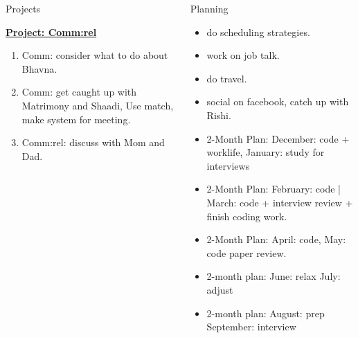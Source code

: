 \documentclass[serif, mathserif, final]{beamer}
\newcommand{\comments}[1]{}
\begin{document}
\begin{frame}
\begin{columns}
\begin{column}{0.5\textwidth}
\begin{block}{Projects}


{\underline{\textbf{Project: Comm:rel}}}
\begin{enumerate} 
  \tiny \item \tiny Comm: consider what to do about Bhavna.
\item \tiny Comm: get caught up with Matrimony and Shaadi, Use match, make system
  for meeting. 
\item \tiny Comm:rel: discuss with Mom and Dad. 
\end{enumerate} 
\end{block} 
\end{column} 


\begin{column}{0.5\textwidth}
\begin{block}{Planning} 
\comments{
{\underline{\textit{2-month plans}}}
{\underline{\textit{January and February:}}}
{\underline{\textit{March and April:}} }
{\underline{\textit{May and June:}}}
}

\begin{itemize}
\tiny \item \tiny do scheduling strategies. 
\item \tiny work on job talk. 
\item \tiny do travel. 
\item \tiny social on facebook, catch up with Rishi. 
\end{itemize} 
\begin{itemize} 
\tiny \item \tiny 2-Month Plan: December: code + worklife, January: study for interviews
\item \tiny 2-Month Plan: February: code | March:  code + interview review + finish coding work. 
\item \tiny 2-Month Plan: April: code, May: code paper review.
\item \tiny 2-month plan: June: relax July: adjust 
\item \tiny 2-month plan: August:  prep September: interview 
\end{itemize}
\end{block}


\end{column}
\end{columns}
\end{frame}
\end{document}
